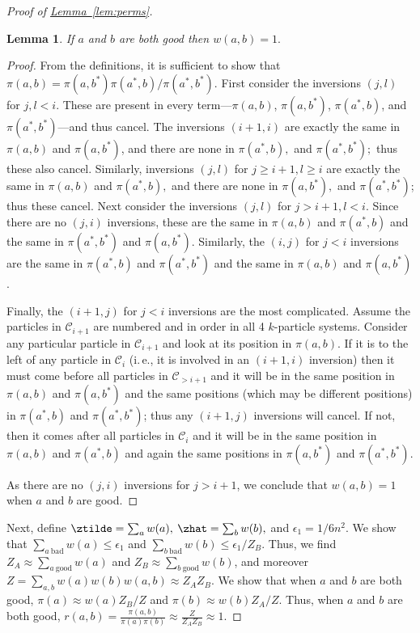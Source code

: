 \documentclass[11pt]{article}
\newtheorem{lemma}[theorem]{Lemma}
\providecommand{\ie}{i.\,e.}
\providecommand{\expref}[2]{\texorpdfstring{\hyperref[#2]{#1~\ref{#2}}}{#1~\ref{#2}}}
\begin{document}
\begin{proof}[Proof of \expref{Lemma}{lem:perms}]
\begin{lemma}\label{lem:good}
If $a$ and $b$ are both good then $w(a,b) = 1.$
\end{lemma}
\begin{proof}  
From the definitions, it is sufficient to show that $\pi(a,b) = 
\pi(a,b^*)\pi(a^*,b)/\pi(a^*,b^*).$ First consider the inversions 
$(j,l)$ for $j,l<i$.  These are present in every term---$\pi(a,b)$, 
$\pi(a,b^*)$, $\pi(a^*,b)$, and $\pi(a^*,b^*)$---and thus cancel. The 
inversions $(i+1,i)$ are exactly the same in $\pi(a,b)$ and 
$\pi(a,b^*)$, and there are none in $\pi(a^*,b),$ and $\pi(a^*,b^*);$ 
thus these also cancel.  Similarly, inversions $(j,l)$ for  $j\geq i+1,l 
\geq i$ are exactly the same in $\pi(a,b)$ and $\pi(a^*,b),$ and there 
are none in $\pi(a,b^*),$ and $\pi(a^*,b^*)$; thus these cancel. 
Next consider the inversions $(j,l)$ for  $j>i+1,l < i$.  Since there 
are no $(j,i)$ inversions, these are the same in $\pi(a,b)$ and 
$\pi(a^*,b)$ and the same in $\pi(a^*,b^*)$ and $\pi(a, b^*).$ 
Similarly, the $(i,j)$ for $j < i$ inversions are the same in 
$\pi(a^*,b)$ and $\pi(a^*,b^*)$ and the same in $\pi(a,b)$ and 
$\pi(a,b^*)$.  

Finally, the $(i+1,j)$ for $j<i$ inversions are the most complicated. 
Assume the particles in $\mathcal{C}_{i+1}$ are numbered and in order 
in all 4 $k$-particle systems.  Consider any particular particle in 
$\mathcal{C}_{i+1}$ and look at its position in $\pi(a,b)$.  If it is 
to the left of any particle in $\mathcal{C}_{i}$ (\ie,  it is involved 
in an $(i+1,i)$ inversion) then it must come before all particles in 
$\mathcal{C}_{> i+1}$ and it will be in the same position in $\pi(a,b)$ 
and $\pi(a,b^*)$ and the same positions (which may be different 
positions) in $\pi(a^*,b)$ and $\pi(a^*,b^*)$; thus any $(i+1,j)$ 
inversions will cancel.  If not, then it comes after all particles in 
$\mathcal{C}_{i}$ and it will be in the same position in $\pi(a,b)$ and 
$\pi(a^*,b)$ and again the same positions in $\pi(a,b^*)$ and 
$\pi(a^*,b^*)$.  

As there are no $(j,i)$ inversions for $j > i+1$, we conclude 
that $w(a,b) = 1$ when $a$ and $b$ are good. 
\end{proof}

Next, define $\ztilde =  \sum_{a} w(a),$  $\zhat =\sum_{b}w(b),$ and 
$\epsilon_1= 1/6n^2$. We show that $\sum_{a~\text{bad}}w(a)\leq 
\epsilon_1$ and $\sum_{b~\text{bad}}w(b)\leq \epsilon_1/Z_B$.  Thus, we 
find $Z_A\approx \sum_{a~\text{good}}  w(a)$ and $Z_B \approx 
\sum_{b~\text{good}}  w(b)$, and moreover 
$Z=\sum_{a,b}w(a)w(b)w(a,b)\approx Z_AZ_B.$ We show that when $a$ and 
$b$ are both good, $\pi(a)\approx w(a)Z_B/Z$ and $\pi(b)\approx 
w(b)Z_A/Z$.  Thus, when $a$ and $b$ are both good, $r(a,b) = 
\frac{\pi(a,b)}{\pi(a)\pi(b)} \approx \frac{Z}{Z_AZ_B}\approx 1.$


\end{proof}
\end{document}
